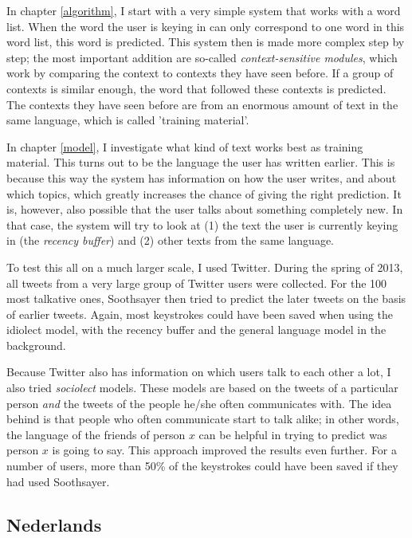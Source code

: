 \documentclass[12pt]{article}
\begin{document}
In chapter \ref{algorithm}, I start with a very simple system that works with a word list. When the word the user is keying in can only correspond to one word in this word list, this word is predicted. This system then is made more complex step by step; the most important addition are so-called \emph{context-sensitive modules}, which work by comparing the context to contexts they have seen before. If a group of contexts is similar enough, the word that followed these contexts is predicted. The contexts they have seen before are from an enormous amount of text in the same language, which is called 'training material'.

In chapter \ref{model}, I investigate what kind of text works best as training material. This turns out to be the language the user has written earlier. This is because this way the system has information on how the user writes, and about which topics, which greatly increases the chance of giving the right prediction. It is, however, also possible that the user talks about something completely new. In that case, the system will try to look at (1) the text the user is currently keying in (the \emph{recency buffer}) and (2) other texts from the same language.

To test this all on a much larger scale, I used Twitter. During the spring of 2013, all tweets from a very large group of Twitter users were collected. For the 100 most talkative ones, Soothsayer then tried to predict the later tweets on the basis of earlier tweets. Again, most keystrokes could have been saved when using the idiolect model, with the recency buffer and the general language model in the background. 

Because Twitter also has information on which users talk to each other a lot, I also tried \emph{sociolect} models. These models are based on the tweets of a particular person \emph{and} the tweets of the people he/she often communicates with. The idea behind is that people who often communicate start to talk alike; in other words, the language of the friends of person $x$ can be helpful in trying to predict was person $x$ is going to say. This approach improved the results even further. For a number of users, more than 50\% of the keystrokes could have been saved if they had used Soothsayer. 

\subsection{Nederlands}
\end{document}
